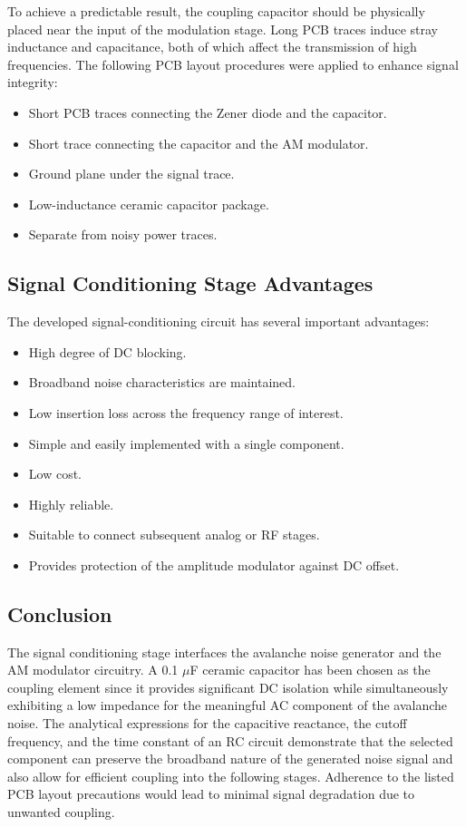 \documentclass[12pt,a4paper]{report}
\begin{document}
	To achieve a predictable result, the coupling capacitor should be physically placed near the input of the modulation stage. Long PCB traces induce stray inductance and capacitance, both of which affect the transmission of high frequencies. The following PCB layout procedures were applied to enhance signal integrity:
	\begin{itemize}
		\item Short PCB traces connecting the Zener diode and the capacitor.
		\item Short trace connecting the capacitor and the AM modulator.
		\item Ground plane under the signal trace.
		\item Low-inductance ceramic capacitor package.
		\item Separate from noisy power traces.
	\end{itemize}
	
	\subsection{Signal Conditioning Stage Advantages}
	
	The developed signal-conditioning circuit has several important advantages:
	\begin{itemize}
		\item High degree of DC blocking.
		\item Broadband noise characteristics are maintained.
		\item Low insertion loss across the frequency range of interest.
		\item Simple and easily implemented with a single component.
		\item Low cost.
		\item Highly reliable.
		\item Suitable to connect subsequent analog or RF stages.
		\item Provides protection of the amplitude modulator against DC offset.
	\end{itemize}
	
	\subsection{Conclusion}
	
	The signal conditioning stage interfaces the avalanche noise generator and the AM modulator circuitry. A 0.1 $\mu$F ceramic capacitor has been chosen as the coupling element since it provides significant DC isolation while simultaneously exhibiting a low impedance for the meaningful AC component of the avalanche noise. The analytical expressions for the capacitive reactance, the cutoff frequency, and the time constant of an RC circuit demonstrate that the selected component can preserve the broadband nature of the generated noise signal and also allow for efficient coupling into the following stages. Adherence to the listed PCB layout precautions would lead to minimal signal degradation due to unwanted coupling.
	
\end{document}
